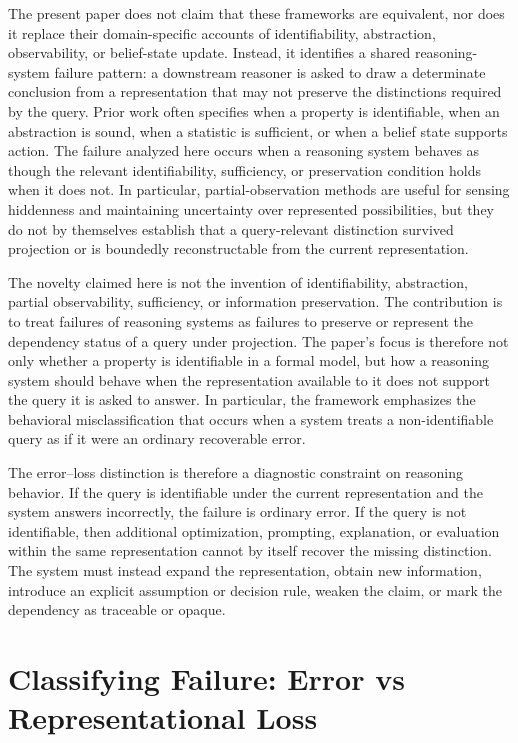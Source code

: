 \documentclass[11pt]{article}
\begin{document}
The present paper does not claim that these frameworks are equivalent, nor does it replace their domain-specific accounts of identifiability, abstraction, observability, or belief-state update. Instead, it identifies a shared reasoning-system failure pattern: a downstream reasoner is asked to draw a determinate conclusion from a representation that may not preserve the distinctions required by the query. Prior work often specifies when a property is identifiable, when an abstraction is sound, when a statistic is sufficient, or when a belief state supports action. The failure analyzed here occurs when a reasoning system behaves as though the relevant identifiability, sufficiency, or preservation condition holds when it does not. In particular, partial-observation methods are useful for sensing hiddenness and maintaining uncertainty over represented possibilities, but they do not by themselves establish that a query-relevant distinction survived projection or is boundedly reconstructable from the current representation.

The novelty claimed here is not the invention of identifiability, abstraction, partial observability, sufficiency, or information preservation. The contribution is to treat failures of reasoning systems as failures to preserve or represent the dependency status of a query under projection. The paper's focus is therefore not only whether a property is identifiable in a formal model, but how a reasoning system should behave when the representation available to it does not support the query it is asked to answer. In particular, the framework emphasizes the behavioral misclassification that occurs when a system treats a non-identifiable query as if it were an ordinary recoverable error.

The error--loss distinction is therefore a diagnostic constraint on reasoning behavior. If the query is identifiable under the current representation and the system answers incorrectly, the failure is ordinary error. If the query is not identifiable, then additional optimization, prompting, explanation, or evaluation within the same representation cannot by itself recover the missing distinction. The system must instead expand the representation, obtain new information, introduce an explicit assumption or decision rule, weaken the claim, or mark the dependency as traceable or opaque.


\section{Classifying Failure: Error vs Representational Loss}
\end{document}
